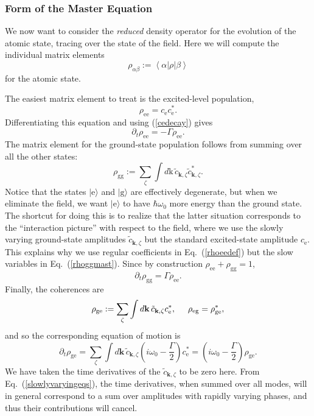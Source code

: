 \documentclass[aps,twocolumn,superscriptaddress,footinbib,floatfix,showpacs]{revtex4}
\def\ket#1{|{#1}\rangle}
\def\expct#1{\!\left\langle{#1}\right\rangle}
\def\eket{\ket{\mathrm{e}}}
\def\gket{\ket{\mathrm{g}}}
\def\ce{c_\mathrm{e}}
\def\ckzt{\tilde c_{\mathbf{k},\zeta}}
\begin{document}
\subsubsection{Form of the Master Equation}

We now want to consider the \textit{reduced}
density operator for the evolution of the atomic state,
tracing over the state of the field.
Here we will compute the individual matrix elements 
\begin{equation}
  \rho_{\alpha\beta}:=\expct{\alpha|\rho|\beta}
\end{equation}
for the atomic state.

The easiest matrix element to treat is the excited-level population,
\begin{equation}
  \rho_{\mathrm{ee}} = \ce\ce^*.
  \label{rhoeedef}
\end{equation}
Differentiating this equation and using (\ref{cedecay}) gives
\begin{equation}
  \partial_t \rho_\mathrm{ee} = -\Gamma \rho_\mathrm{ee}.
  \label{rhoeedecay}
\end{equation}
The matrix element for the ground-state population follows from summing
over all the other states:
\begin{equation}
  \rho_\mathrm{gg} :=  \sum_{\zeta}\int d\mathrm{k}\, \ckzt\ckzt^*.
  \label{rhoggmast}
\end{equation}
Notice that the states $\eket$ and $\gket$ are effectively degenerate,
but when we eliminate the field, we want $\eket$ to have $\hbar\omega_0$
more energy than the ground state.  The shortcut for doing this
is to realize that the latter situation corresponds to the 
``interaction picture'' with respect to the field, where
we use the slowly varying ground-state
amplitudes $\ckzt$ but the standard excited-state amplitude $\ce$.
This explains why we use regular coefficients in
Eq.~(\ref{rhoeedef})
but the slow variables in
Eq.~(\ref{rhoggmast}).
Since by construction $\rho_\mathrm{ee} + \rho_\mathrm{gg} = 1$,
\begin{equation}
  \partial_t \rho_\mathrm{gg} = \Gamma \rho_\mathrm{ee}.
\end{equation}
Finally, the coherences are
\begin{equation}
  \rho_\mathrm{ge} := \sum_\zeta\int d\mathbf{k}\,\ckzt \ce^*,
  \hspace{5mm}\rho_\mathrm{eg}=\rho_\mathrm{ge}^*,
\end{equation}
and so the corresponding equation of motion is
\begin{equation}
  \partial_t\rho_\mathrm{ge} = \sum_\zeta\int d\mathbf{k}\,\ckzt 
   \left(i\omega_0 -\frac{\Gamma}{2}\right)\ce^*
   = \left(i\omega_0 -\frac{\Gamma}{2}\right)\rho_\mathrm{ge}.
\end{equation}
We have taken the time derivatives of the $\ckzt$ to be zero here. From 
Eq.~(\ref{slowlyvaryingeqs}), the time derivatives, when summed over all
modes, will in general correspond to a sum over amplitudes with
rapidly varying phases, and thus their contributions will cancel.
\end{document}
